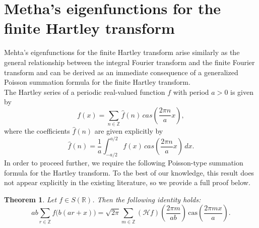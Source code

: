 \documentclass[12 pt]{amsart}
\numberwithin{equation}{section}
\newtheorem{theorem}{Theorem}[section]
\begin{document}
\section{Metha's eigenfunctions for the finite Hartley transform}
Mehta's eigenfunctions for the finite Hartley transform arise similarly  as the general relationship between the integral Fourier transform and the finite Fourier transform and can be derived as an immediate consequence of a generalized Poisson summation formula for the finite Hartley transform.\\
The Hartley series of a  periodic real-valued function $f$ with period $a>0$  is given by \cite[\S 2]{Hey}
\begin{equation}
f(x)=\sum_{n\in\mathbb{Z}}\widehat{f}(n)\, cas(\frac{2\pi n}{a}x),
\end{equation}
where the coefficients $\widehat{f}(n)$ are given explicitly by  \begin{equation}
\widehat{f}(n)=\frac{1}{a}\int_{-a/2}^{a/2}f(x)\,cas(\frac{2\pi n}{a}x)\,dx.
\end{equation}
In order to proceed further, we require the following Poisson-type summation formula for the Hartley transform. To the best of our knowledge, this result does not appear explicitly in the existing literature, so we provide a full proof below.

\begin{theorem}\label{T1}
Let \( f \in S(\mathbb{R}) \). Then the following identity holds:
\begin{equation}\label{1f1}
ab \sum_{r \in \mathbb{Z}} f\big(b(ar + x)\big)
= \sqrt{2\pi} \sum_{m \in \mathbb{Z}} (\mathscr{H}f)\left( \frac{2\pi m}{ab} \right) \, \mathrm{cas}\left( \frac{2\pi m x}{a} \right).
\end{equation}
\end{theorem}
\end{document}
